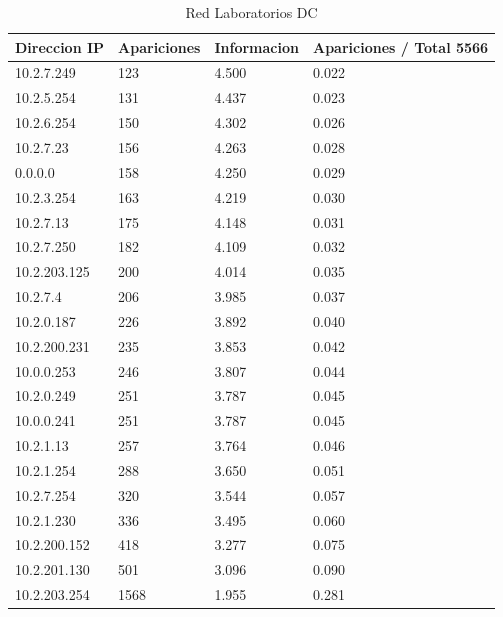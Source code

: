 \begin{table}[H]
\centering
\caption{Red Laboratorios DC}
\label{my-label}
\begin{tabular}{@{}llll@{}}
\toprule
Direccion IP & Apariciones & Informacion        & Apariciones / Total 5566 \\ \midrule
10.2.7.249   & 123         & 4.500              & 0.022                    \\
10.2.5.254   & 131         & 4.437              & 0.023                    \\
10.2.6.254   & 150         & 4.302              & 0.026                    \\
10.2.7.23    & 156         & 4.263              & 0.028                    \\
0.0.0.0      & 158         & 4.250              & 0.029                    \\
10.2.3.254   & 163         & 4.219              & 0.030                    \\
10.2.7.13    & 175         & 4.148              & 0.031                    \\
10.2.7.250   & 182         & 4.109              & 0.032                    \\
10.2.203.125 & 200         & 4.014              & 0.035                    \\
10.2.7.4     & 206         & 3.985              & 0.037                    \\
10.2.0.187   & 226         & 3.892              & 0.040                    \\
10.2.200.231 & 235         & 3.853              & 0.042                    \\
10.0.0.253   & 246         & 3.807              & 0.044                    \\
10.2.0.249   & 251         & 3.787              & 0.045                    \\
10.0.0.241   & 251         & 3.787              & 0.045                    \\
10.2.1.13    & 257         & 3.764              & 0.046                    \\
10.2.1.254   & 288         & 3.650              & 0.051                    \\
10.2.7.254   & 320         & 3.544              & 0.057                    \\
10.2.1.230   & 336         & 3.495              & 0.060                    \\
10.2.200.152 & 418         & 3.277              & 0.075                    \\
10.2.201.130 & 501         & 3.096              & 0.090                    \\
10.2.203.254 & 1568        & 1.955              & 0.281                    \\ \bottomrule
\end{tabular}
\end{table}

